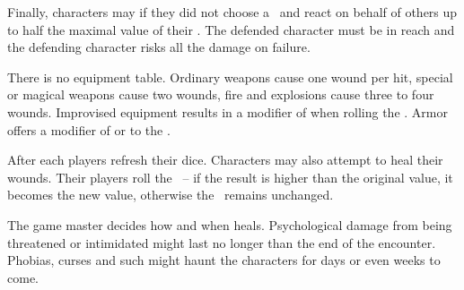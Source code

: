 {		Finally, characters may  if they did not choose a \AD\ and react on behalf of others up to half the maximal value of their \RD. The defended character must be in reach and the defending character risks all the damage on failure.


		\noindent
		There is no equipment table. Ordinary weapons cause one wound per hit, special or magical weapons cause two wounds, fire and explosions cause three to four wounds. Improvised equipment results in a modifier of  when rolling the \AD. Armor offers a modifier of  or  to the \RD.


		\noindent
		After each  players refresh their dice. Characters may also attempt to heal their wounds. Their players roll the \HD\ -- if the result is higher than the original value, it becomes the new value, otherwise the \HD\ remains unchanged.

		The game master decides how and when  heals. Psychological damage from being threatened or intimidated might last no longer than the end of the encounter. Phobias, curses and such might haunt the characters for days or even weeks to come.
}

